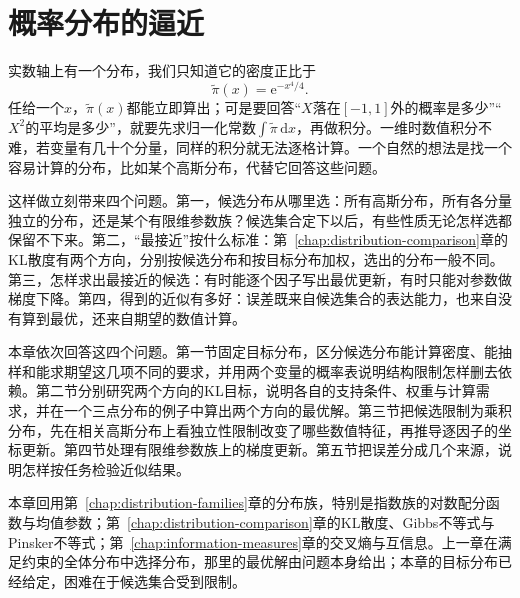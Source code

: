 \chapter{概率分布的逼近}
\label{chap:distribution-approximation}

实数轴上有一个分布，我们只知道它的密度正比于
\[
 \widetilde{\pi}(x)=\mathrm{e}^{-x^{4}/4} .
\]
任给一个$x$，$\widetilde{\pi}(x)$都能立即算出；可是要回答“$X$落在$[-1,1]$外的概率是多少”“$X^{2}$的平均是多少”，就要先求归一化常数$\int\widetilde{\pi}\,\mathrm{d}x$，再做积分。一维时数值积分不难，若变量有几十个分量，同样的积分就无法逐格计算。一个自然的想法是找一个容易计算的分布，比如某个高斯分布，代替它回答这些问题。

这样做立刻带来四个问题。第一，候选分布从哪里选：所有高斯分布，所有各分量独立的分布，还是某个有限维参数族？候选集合定下以后，有些性质无论怎样选都保留不下来。第二，“最接近”按什么标准：第~\ref{chap:distribution-comparison}章的KL散度有两个方向，分别按候选分布和按目标分布加权，选出的分布一般不同。第三，怎样求出最接近的候选：有时能逐个因子写出最优更新，有时只能对参数做梯度下降。第四，得到的近似有多好：误差既来自候选集合的表达能力，也来自没有算到最优，还来自期望的数值计算。

本章依次回答这四个问题。第一节固定目标分布，区分候选分布能计算密度、能抽样和能求期望这几项不同的要求，并用两个变量的概率表说明结构限制怎样删去依赖。第二节分别研究两个方向的KL目标，说明各自的支持条件、权重与计算需求，并在一个三点分布的例子中算出两个方向的最优解。第三节把候选限制为乘积分布，先在相关高斯分布上看独立性限制改变了哪些数值特征，再推导逐因子的坐标更新。第四节处理有限维参数族上的梯度更新。第五节把误差分成几个来源，说明怎样按任务检验近似结果。

本章回用第~\ref{chap:distribution-families}章的分布族，特别是指数族的对数配分函数与均值参数；第~\ref{chap:distribution-comparison}章的KL散度、Gibbs不等式与Pinsker不等式；第~\ref{chap:information-measures}章的交叉熵与互信息。上一章在满足约束的全体分布中选择分布，那里的最优解由问题本身给出；本章的目标分布已经给定，困难在于候选集合受到限制。







